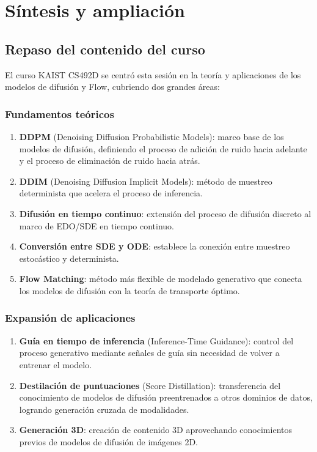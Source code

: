 \section{Síntesis y ampliación}

\subsection{Repaso del contenido del curso}

El curso KAIST CS492D se centró esta sesión en la teoría y aplicaciones de los modelos de difusión y Flow, cubriendo dos grandes áreas:

\subsubsection{Fundamentos teóricos}

\begin{enumerate}
    \item \textbf{DDPM} (Denoising Diffusion Probabilistic Models): marco base de los modelos de difusión, definiendo el proceso de adición de ruido hacia adelante y el proceso de eliminación de ruido hacia atrás.
    \item \textbf{DDIM} (Denoising Diffusion Implicit Models): método de muestreo determinista que acelera el proceso de inferencia.
    \item \textbf{Difusión en tiempo continuo}: extensión del proceso de difusión discreto al marco de EDO/SDE en tiempo continuo.
    \item \textbf{Conversión entre SDE y ODE}: establece la conexión entre muestreo estocástico y determinista.
    \item \textbf{Flow Matching}: método más flexible de modelado generativo que conecta los modelos de difusión con la teoría de transporte óptimo.
\end{enumerate}

\subsubsection{Expansión de aplicaciones}

\begin{enumerate}
    \item \textbf{Guía en tiempo de inferencia} (Inference-Time Guidance): control del proceso generativo mediante señales de guía sin necesidad de volver a entrenar el modelo.
    \item \textbf{Destilación de puntuaciones} (Score Distillation): transferencia del conocimiento de modelos de difusión preentrenados a otros dominios de datos, logrando generación cruzada de modalidades.
    \item \textbf{Generación 3D}: creación de contenido 3D aprovechando conocimientos previos de modelos de difusión de imágenes 2D.
\end{enumerate}

